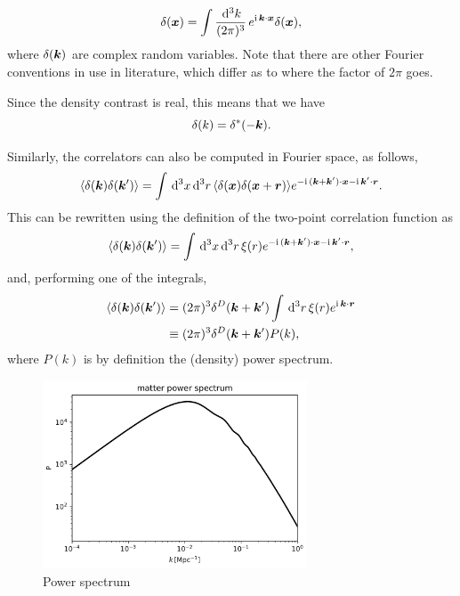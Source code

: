 \begin{equation}
	\delta({\bm {x}}) = \int \frac{\,\mathrm{d}^3k}{(2\pi)^3} \, e^{\mathrm{i\,} \bm {k} \cdot \bm {x} } \delta(\bm {x}),
\end{equation}
where $\delta(\bm {k})$ are complex random variables. Note that there are other Fourier conventions in use in literature, which differ as to where the factor of $2\pi$ goes.

Since the density contrast is real, this means that we have
\begin{equation}
	\delta(k) = \delta^*(-\bm {k}).
\end{equation}

Similarly, the correlators can also be computed in Fourier space, as follows, 
\begin{equation}
	\langle \delta(\bm {k}) \delta(\bm {k}') \rangle = \int \,\mathrm{d}^3 x \,\mathrm{d}^3 r \, \langle \delta(\bm {x}) \delta(\bm {x} + \bm{r})\rangle e^{-\mathrm{i\,} (\bm {k} + \bm {k}') \cdot \bm {x} - \mathrm{i\,} \bm {k}' \cdot \bm{r}}.
\end{equation}
This can be rewritten using the definition of the two-point correlation function as 
\begin{equation}
	\langle \delta(\bm {k}) \delta(\bm {k}') \rangle = \int \,\mathrm{d}^3 x \,\mathrm{d}^3 r \, \xi(r) e^{-\mathrm{i\,} (\bm {k} + \bm {k}') \cdot \bm {x} - \mathrm{i\,} \bm {k}' \cdot \bm{r}},
\end{equation}
and, performing one of the integrals, 
\begin{align}
	\langle \delta(\bm {k}) \delta(\bm {k}') \rangle &= (2\pi)^3 \delta^D(\bm {k} + \bm {k}') \int \,\mathrm{d}^3 r \,\xi(r) e^{\mathrm{i\,} \bm {k} \cdot \bm{r}} \\
	&\equiv (2\pi)^3 \delta^D(\bm {k} + \bm {k}') P(k),
\end{align}
where $P(k)$ is by definition the (density) power spectrum. 

\begin{figure}[!ht]
	\centering
	\includegraphics[width=0.7\textwidth]{fig/placeholder_pk.png}
	\caption{Power spectrum}
\end{figure}


